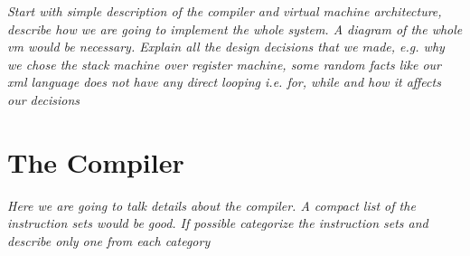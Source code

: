 \documentclass[11pt]{article}
\begin{document}
{\itshape{Start with simple description of the compiler and virtual
    machine architecture, describe how we are going to implement the
    whole system. A diagram of the whole vm would be
    necessary. Explain all the design decisions that we made, e.g. why
    we chose the stack machine over register machine, some random facts
    like our xml language does not have any direct looping i.e. for,
    while and how it affects our decisions}}

\section{The Compiler}
\label{sec:compiler}

{\itshape{Here we are going to talk details about the compiler. A
    compact list of the instruction sets would be good. If possible
    categorize the instruction sets and describe only one from each category}}






\end{document}

